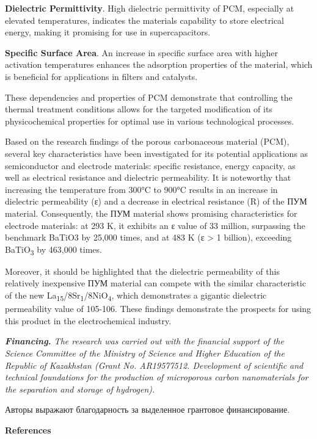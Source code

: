 {\bfseries Dielectric Permittivity}. High dielectric permittivity of PCM,
especially at elevated temperatures, indicates the
material\textquotesingle s capability to store electrical energy, making
it promising for use in supercapacitors.

{\bfseries Specific Surface Area}. An increase in specific surface area
with higher activation temperatures enhances the adsorption properties
of the material, which is beneficial for applications in filters and
catalysts.

These dependencies and properties of PCM demonstrate that controlling
the thermal treatment conditions allows for the targeted modification of
its physicochemical properties for optimal use in various technological
processes.

Based on the research findings of the porous carbonaceous material
(PCM), several key characteristics have been investigated for its
potential applications as semiconductor and electrode materials:
specific resistance, energy capacity, as well as electrical resistance
and dielectric permeability. It is noteworthy that increasing the
temperature from 300°C to 900°C results in an increase in dielectric
permeability (ε) and a decrease in electrical resistance (R) of the ПУМ
material. Consequently, the ПУМ material shows promising characteristics
for electrode materials: at 293 K, it exhibits an ε value of 33 million,
surpassing the benchmark BaTiO3 by 25,000 times, and at 483 K (ε
\textgreater{} 1 billion), exceeding BaTiO\textsubscript{3} by 463,000
times.

Moreover, it should be highlighted that the dielectric permeability of
this relatively inexpensive ПУМ material can compete with the similar
characteristic of the new
La\textsubscript{15}/8Sr\textsubscript{1}/8NiO\textsubscript{4}, which
demonstrates a gigantic dielectric permeability value of 105-106. These
findings demonstrate the prospects for using this product in the
electrochemical industry.

\emph{{\bfseries Financing.} The research was carried out with the
financial support of the Science Committee of the Ministry of Science
and Higher Education of the Republic of Kazakhstan (Grant No.
AR19577512. Development of scientific and technical foundations for the
production of microporous carbon nanomaterials for the separation and
storage of hydrogen).}

Авторы выражают благодарность за выделенное грантовое финансирование.

{\bfseries References}

